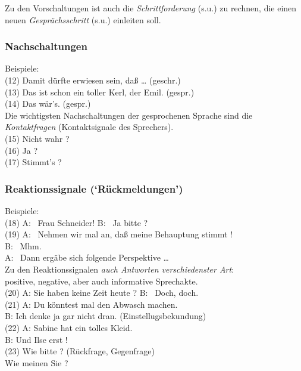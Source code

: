 \documentclass[
  letterpaper,
]{scrbook}
\begin{document}
Zu den Vorschaltungen ist auch die \emph{Schrittforderung} (s.u.) zu
rechnen, die einen neuen \emph{Gesprächsschritt} (s.u.) einleiten
soll.\\

\hypertarget{nachschaltungen}{%
\subsubsection{Nachschaltungen}\label{nachschaltungen}}

Beispiele:\\
(12) Damit dürfte erwiesen sein, daß \ldots{} (geschr.)\\
(13) Das ist schon ein toller Kerl, der Emil. (gespr.)\\
(14) Das wär's. (gespr.)\\

Die wichtigsten Nachschaltungen der gesprochenen Sprache sind die
\emph{Kontaktfragen} (Kontaktsignale des Sprechers).\\
(15) Nicht wahr ?\\
(16) Ja ?\\
(17) Stimmt's ?\\

\hypertarget{reaktionssignale-ruxfcckmeldungen}{%
\subsubsection{Reaktionssignale
(`Rückmeldungen')}\label{reaktionssignale-ruxfcckmeldungen}}

Beispiele:\\
(18) A: ~Frau Schneider! B: ~Ja bitte ?\\
(19) A: ~Nehmen wir mal an, daß meine Behauptung stimmt !\\
B: ~Mhm.\\
A: ~Dann ergäbe sich folgende Perspektive \ldots{}\\

Zu den Reaktionssignalen \emph{auch Antworten verschiedenster Art}:\\
positive, negative, aber auch informative Sprechakte.\\
(20) A: Sie haben keine Zeit heute ? B: ~Doch, doch.\\
(21) A: Du könntest mal den Abwasch machen.\\
B: Ich denke ja gar nicht dran. (Einstellugsbekundung)\\
(22) A: Sabine hat ein tolles Kleid.\\
B: Und Ilse erst !\\
(23) Wie bitte ? (Rückfrage, Gegenfrage)\\
Wie meinen Sie ?\\
\end{document}
